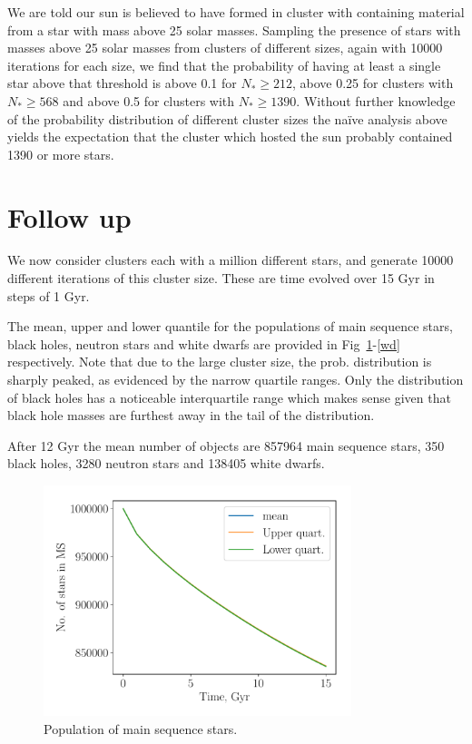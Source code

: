 \documentclass{article}
\begin{document}
We are told our sun is believed to have formed in cluster with containing
material from a star with mass above 25 solar masses.
Sampling the presence of stars with masses above 25 solar masses from clusters
of different sizes, again with 10000 iterations for each size, we find that
the probability of having at least a single star above that threshold is
above 0.1 for $N_*\geq212$, above 0.25 for clusters
with $N_*\geq568$ and above 0.5 for clusters with $N_*\geq1390$.
Without further knowledge of the probability distribution of different cluster
sizes the na\"ive analysis above yields the expectation that the cluster
which hosted the sun probably contained 1390 or more stars.

\section{Follow up}
We now consider clusters each with a million different stars, and generate
10000 different iterations of this cluster size. These are time evolved over
15 Gyr in steps of 1 Gyr.

The mean, upper and lower quantile for the populations of main sequence stars,
black holes, neutron stars and white dwarfs are provided in
Fig~\ref{ms}-\ref{wd} respectively. Note that due to the large cluster
size, the prob. distribution is sharply peaked, as evidenced
by the narrow quartile ranges. Only the distribution of black holes has
a noticeable interquartile range which makes sense given that black hole
masses are furthest away in the tail of the distribution.

After 12 Gyr the mean number of objects are 857964 main sequence stars,
350 black holes, 3280 neutron stars and 138405 white dwarfs.

\begin{figure}
\centering
\includegraphics[width=0.8\textwidth]{ms.pdf}
\caption{Population of main sequence stars.}
\label{ms}
\end{figure}
\end{document}

